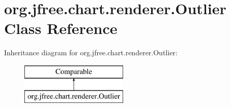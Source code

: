 \hypertarget{classorg_1_1jfree_1_1chart_1_1renderer_1_1_outlier}{}\section{org.\+jfree.\+chart.\+renderer.\+Outlier Class Reference}
\label{classorg_1_1jfree_1_1chart_1_1renderer_1_1_outlier}
Inheritance diagram for org.\+jfree.\+chart.\+renderer.\+Outlier\+:\begin{figure}[H]
\begin{center}
\leavevmode
\includegraphics[height=2.000000cm]{classorg_1_1jfree_1_1chart_1_1renderer_1_1_outlier}
\end{center}
\end{figure}
